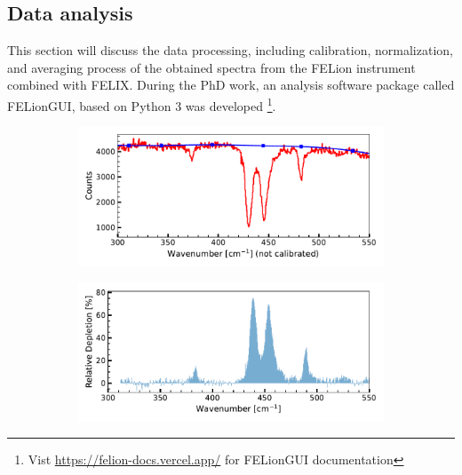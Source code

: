 \subsection{Data analysis}
\label{subsec:ir:data-analysis}

This section will discuss the data processing, including calibration, normalization, and averaging process of the obtained spectra from the FELion instrument combined with FELIX. During the PhD work, an analysis software package called FELionGUI, based on Python 3 was developed \footnote{Vist \url{https://felion-docs.vercel.app/} for FELionGUI documentation}.\\

\begin{figure}[!htb]
    \centering
    
    \begin{subfigure}[b]{0.45\textwidth}
        \includegraphics[width=1\textwidth]{figures/IR-data-norm/baseline_correction.pdf}
        \caption{}
        \label{fig:data-process:raw}
    \end{subfigure}
    \hfill
    \begin{subfigure}[b]{0.45\textwidth}
        \centering
        \includegraphics[width=1\textwidth]{figures/IR-data-norm/processed.pdf}
        \caption{}
        \label{fig:data-process:processed}
        \end{subfigure}

\end{figure}
